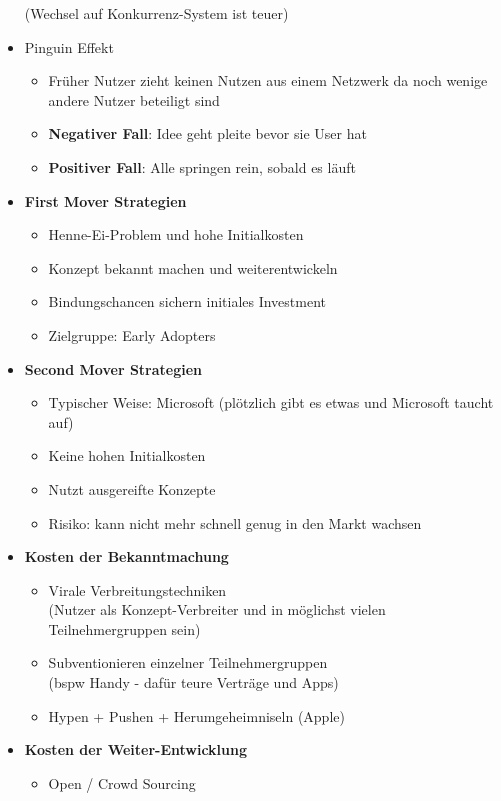 \documentclass{article} %
\begin{document}
\begin{itemize}
			(Wechsel auf Konkurrenz-System ist teuer)
			\item Pinguin Effekt
				\begin{itemize}
					\item Früher Nutzer zieht keinen Nutzen aus einem Netzwerk da noch wenige andere Nutzer beteiligt sind
					\item \textbf{Negativer Fall}: Idee geht pleite bevor sie User hat
					\item \textbf{Positiver Fall}: Alle springen rein, sobald es läuft
				\end{itemize}
			\item \textbf{First Mover Strategien}
				\begin{itemize}
					\item Henne-Ei-Problem und hohe Initialkosten
					\item Konzept bekannt machen und weiterentwickeln
					\item Bindungschancen sichern initiales Investment 
					\item Zielgruppe: Early Adopters
				\end{itemize}
			\item \textbf{Second Mover Strategien}
				\begin{itemize}
					\item Typischer Weise: Microsoft (plötzlich gibt es etwas und Microsoft taucht auf)
					\item Keine hohen Initialkosten
					\item Nutzt ausgereifte Konzepte
					\item Risiko: kann nicht mehr schnell genug in den Markt wachsen
				\end{itemize}
			\item \textbf{Kosten der Bekanntmachung}
			\begin{itemize}
				\item Virale Verbreitungstechniken\\
				(Nutzer als Konzept-Verbreiter und in möglichst vielen Teilnehmergruppen sein)
				\item Subventionieren einzelner Teilnehmergruppen\\
				(bspw Handy - dafür teure Verträge und Apps)
				\item Hypen + Pushen + Herumgeheimniseln (Apple)
			\end{itemize}
			\item \textbf{Kosten der Weiter-Entwicklung}
			\begin{itemize}
				\item Open / Crowd Sourcing

\end{itemize}
\end{itemize}
\end{document}
